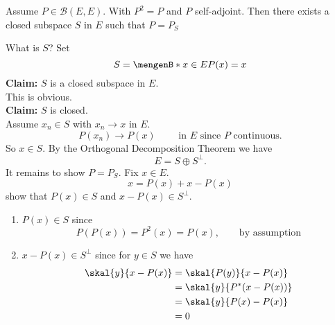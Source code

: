 \begin{proposition}
	Assume $P \in \mathcal{B}(E,E)$. With $P^2=P$ and $P$ self-adjoint. Then there exists a closed subspace $S$ in $E$ such that $P=P_S$
\end{proposition}
\begin{beweis}
	What is $S$? Set 
	\[
		S= \set[x \in E]{P(x)=x}
	\]
	\textbf{Claim:} \text{    }$S$ is a closed subspace in $E$.  \\
	This is obvious. \\
	\textbf{Claim:} \text{    }$S$ is closed. \\
	Assume $x_n \in S$ with $x_n \to x$ in $E$. 
	\[
		P(x_n) \to P(x) \qquad \text{ in }E \text{ since $P$ continuous.}
	\]
	So $x \in S$. By the Orthogonal Decomposition Theorem we have 
	\[
		E = S \oplus S^{\perp}.
	\]
	It remains to show $P = P_S$. Fix $x \in E$.
	\[
		x = P(x) + x- P(x)
	\]
	show that $P(x) \in S$ and $x-P(x) \in S^{\perp}$.
	\begin{enumerate}
		\item $P(x) \in S$ since 
		\[
			P(P(x)) = P^2(x) = P(x), \qquad \text{by assumption}
		\]
		\item $x-P(x) \in S^{\perp}$ since for $y \in S$ we have
		\begin{align*}
			\skal{y}{x-P(x)} &= \skal{P(y)}{x-P(x)} \\
			&= \skal{y}{P^*(x- P(x))} \\
			&= \skal{y}{P(x)-P(x)} \\
			&= 0
		\end{align*}
	\end{enumerate}
\end{beweis}

